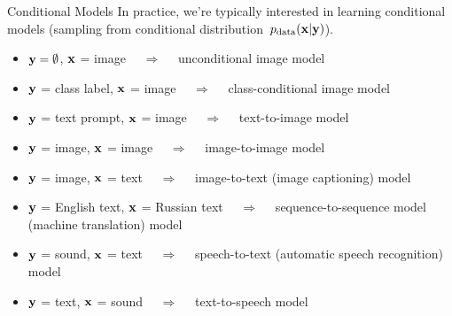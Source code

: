 \documentclass{beamer}
\renewcommand{\eqpause}{}
\begin{document}
\begin{frame}{ Conditional Models}
	In practice, we're typically interested in learning conditional models (sampling from conditional distribution~$p_{\text{data}}(\mathbf{x} | \mathbf{y})$). 
	\eqpause
	\begin{itemize}
		\item $\mathbf{y} = \emptyset$, $\mathbf{x}$ = image $\quad\Rightarrow\quad$ unconditional image model
		\item $\mathbf{y}$ = class label, $\mathbf{x}$ = image $\quad\Rightarrow\quad$ class-conditional image model
		\item $\mathbf{y}$ = text prompt, $\mathbf{x}$ = image $\quad\Rightarrow\quad$ text-to-image model
		\item $\mathbf{y}$ = image, $\mathbf{x}$ = image $\quad\Rightarrow\quad$ image-to-image model
		\item $\mathbf{y}$ = image, $\mathbf{x}$ = text $\quad\Rightarrow\quad$ image-to-text (image captioning) model
		\item $\mathbf{y}$ = English text, $\mathbf{x}$ = Russian text $\quad\Rightarrow\quad$ sequence-to-sequence model (machine translation) model
		\item $\mathbf{y}$ = sound, $\mathbf{x}$ = text $\quad\Rightarrow\quad$ speech-to-text (automatic speech recognition) model
		\item $\mathbf{y}$ = text, $\mathbf{x}$ = sound $\quad\Rightarrow\quad$ text-to-speech model
	\end{itemize}
\end{frame}
\end{document}
